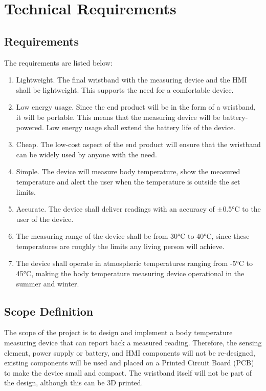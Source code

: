 \section{Technical Requirements}\label{1.7}
\subsection{Requirements}
The requirements are listed below:
\begin{enumerate}
	\item Lightweight. The final wristband with the measuring device and the HMI shall be lightweight. This supports the need for a comfortable device. 
	\item Low energy usage. Since the end product will be in the form of a wristband, it will be portable. This means that the measuring device will be battery-powered. Low energy usage shall extend the battery life of the device. 
	\item Cheap. The low-cost aspect of the end product will ensure that the wristband can be widely used by anyone with the need. 
	\item Simple. The device will measure body temperature, show the measured temperature and alert the user when the temperature is outside the set limits.
	\item Accurate. The device shall deliver readings with an accuracy of $\pm$0.5°C to the user of the device. 
	\item The measuring range of the device shall be from 30°C to 40°C, since these temperatures are roughly the limits any living person will achieve.  
	\item The device shall operate in atmospheric temperatures ranging from -5°C to 45°C, making the body temperature measuring device operational in the summer and winter.  
\end{enumerate}

\subsection{Scope Definition}
The scope of the project is to design and implement a body temperature measuring device that can report back a measured reading. Therefore, the sensing element, power supply or battery, and HMI components will not be re-designed, existing components will be used and placed on a Printed Circuit Board (PCB) to make the device small and compact. The wristband itself will not be part of the design, although this can be 3D printed. 

